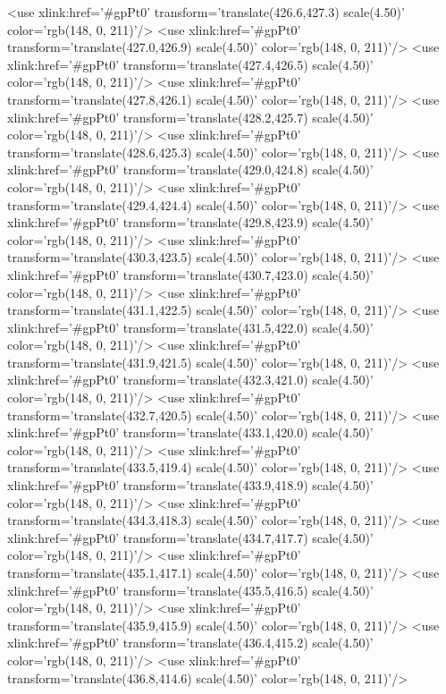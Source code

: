 	<use xlink:href='#gpPt0' transform='translate(426.6,427.3) scale(4.50)' color='rgb(148,   0, 211)'/>
	<use xlink:href='#gpPt0' transform='translate(427.0,426.9) scale(4.50)' color='rgb(148,   0, 211)'/>
	<use xlink:href='#gpPt0' transform='translate(427.4,426.5) scale(4.50)' color='rgb(148,   0, 211)'/>
	<use xlink:href='#gpPt0' transform='translate(427.8,426.1) scale(4.50)' color='rgb(148,   0, 211)'/>
	<use xlink:href='#gpPt0' transform='translate(428.2,425.7) scale(4.50)' color='rgb(148,   0, 211)'/>
	<use xlink:href='#gpPt0' transform='translate(428.6,425.3) scale(4.50)' color='rgb(148,   0, 211)'/>
	<use xlink:href='#gpPt0' transform='translate(429.0,424.8) scale(4.50)' color='rgb(148,   0, 211)'/>
	<use xlink:href='#gpPt0' transform='translate(429.4,424.4) scale(4.50)' color='rgb(148,   0, 211)'/>
	<use xlink:href='#gpPt0' transform='translate(429.8,423.9) scale(4.50)' color='rgb(148,   0, 211)'/>
	<use xlink:href='#gpPt0' transform='translate(430.3,423.5) scale(4.50)' color='rgb(148,   0, 211)'/>
	<use xlink:href='#gpPt0' transform='translate(430.7,423.0) scale(4.50)' color='rgb(148,   0, 211)'/>
	<use xlink:href='#gpPt0' transform='translate(431.1,422.5) scale(4.50)' color='rgb(148,   0, 211)'/>
	<use xlink:href='#gpPt0' transform='translate(431.5,422.0) scale(4.50)' color='rgb(148,   0, 211)'/>
	<use xlink:href='#gpPt0' transform='translate(431.9,421.5) scale(4.50)' color='rgb(148,   0, 211)'/>
	<use xlink:href='#gpPt0' transform='translate(432.3,421.0) scale(4.50)' color='rgb(148,   0, 211)'/>
	<use xlink:href='#gpPt0' transform='translate(432.7,420.5) scale(4.50)' color='rgb(148,   0, 211)'/>
	<use xlink:href='#gpPt0' transform='translate(433.1,420.0) scale(4.50)' color='rgb(148,   0, 211)'/>
	<use xlink:href='#gpPt0' transform='translate(433.5,419.4) scale(4.50)' color='rgb(148,   0, 211)'/>
	<use xlink:href='#gpPt0' transform='translate(433.9,418.9) scale(4.50)' color='rgb(148,   0, 211)'/>
	<use xlink:href='#gpPt0' transform='translate(434.3,418.3) scale(4.50)' color='rgb(148,   0, 211)'/>
	<use xlink:href='#gpPt0' transform='translate(434.7,417.7) scale(4.50)' color='rgb(148,   0, 211)'/>
	<use xlink:href='#gpPt0' transform='translate(435.1,417.1) scale(4.50)' color='rgb(148,   0, 211)'/>
	<use xlink:href='#gpPt0' transform='translate(435.5,416.5) scale(4.50)' color='rgb(148,   0, 211)'/>
	<use xlink:href='#gpPt0' transform='translate(435.9,415.9) scale(4.50)' color='rgb(148,   0, 211)'/>
	<use xlink:href='#gpPt0' transform='translate(436.4,415.2) scale(4.50)' color='rgb(148,   0, 211)'/>
	<use xlink:href='#gpPt0' transform='translate(436.8,414.6) scale(4.50)' color='rgb(148,   0, 211)'/>
